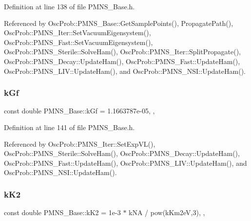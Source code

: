 Definition at line 138 of file P\+M\+N\+S\+\_\+\+Base.\+h.



Referenced by Osc\+Prob\+::\+P\+M\+N\+S\+\_\+\+Base\+::\+Get\+Sample\+Points(), Propagate\+Path(), Osc\+Prob\+::\+P\+M\+N\+S\+\_\+\+Iter\+::\+Set\+Vacuum\+Eigensystem(), Osc\+Prob\+::\+P\+M\+N\+S\+\_\+\+Fast\+::\+Set\+Vacuum\+Eigensystem(), Osc\+Prob\+::\+P\+M\+N\+S\+\_\+\+Sterile\+::\+Solve\+Ham(), Osc\+Prob\+::\+P\+M\+N\+S\+\_\+\+Iter\+::\+Split\+Propagate(), Osc\+Prob\+::\+P\+M\+N\+S\+\_\+\+Decay\+::\+Update\+Ham(), Osc\+Prob\+::\+P\+M\+N\+S\+\_\+\+Fast\+::\+Update\+Ham(), Osc\+Prob\+::\+P\+M\+N\+S\+\_\+\+L\+I\+V\+::\+Update\+Ham(), and Osc\+Prob\+::\+P\+M\+N\+S\+\_\+\+N\+S\+I\+::\+Update\+Ham().

\mbox{\label{classOscProb_1_1PMNS__Base_a7f26a3456128234b2ae6cc9141a6532f}} 
\subsubsection{\texorpdfstring{k\+Gf}{kGf}}
{\footnotesize\ttfamily const double P\+M\+N\+S\+\_\+\+Base\+::k\+Gf = 1.\+1663787e-\/05\hspace{0.3cm}{\ttfamily [static]}, {\ttfamily [protected]}, {\ttfamily [inherited]}}



Definition at line 141 of file P\+M\+N\+S\+\_\+\+Base.\+h.



Referenced by Osc\+Prob\+::\+P\+M\+N\+S\+\_\+\+Iter\+::\+Set\+Exp\+V\+L(), Osc\+Prob\+::\+P\+M\+N\+S\+\_\+\+Sterile\+::\+Solve\+Ham(), Osc\+Prob\+::\+P\+M\+N\+S\+\_\+\+Decay\+::\+Update\+Ham(), Osc\+Prob\+::\+P\+M\+N\+S\+\_\+\+Fast\+::\+Update\+Ham(), Osc\+Prob\+::\+P\+M\+N\+S\+\_\+\+L\+I\+V\+::\+Update\+Ham(), and Osc\+Prob\+::\+P\+M\+N\+S\+\_\+\+N\+S\+I\+::\+Update\+Ham().

\mbox{\label{classOscProb_1_1PMNS__Base_a326fc5016d7dd7ce05682c06cdcb6d94}} 
\subsubsection{\texorpdfstring{k\+K2}{kK2}}
{\footnotesize\ttfamily const double P\+M\+N\+S\+\_\+\+Base\+::k\+K2 = 1e-\/3 $\ast$ k\+N\+A / pow(k\+Km2e\+V,3)\hspace{0.3cm}{\ttfamily [static]}, {\ttfamily [protected]}, {\ttfamily [inherited]}}



